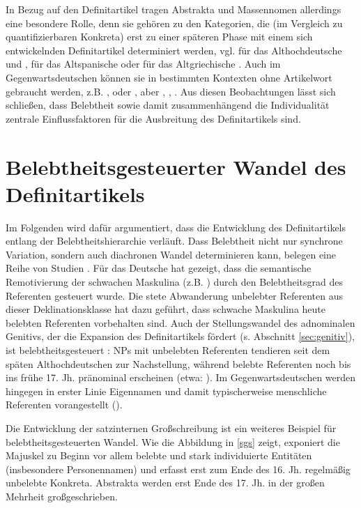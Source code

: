 In Bezug auf den Definitartikel tragen Abstrakta und Massennomen allerdings eine besondere Rolle, denn sie gehören zu den Kategorien, die (im Vergleich zu quantifizierbaren Konkreta) erst zu einer späteren Phase mit einem sich entwickelnden Definitartikel determiniert werden, vgl. für das Althochdeutsche \textcite{Oubouzar1992} und \textcite{Szczepaniak2011}, für das Altspanische \textcite{Company1991}  oder für das Altgriechische \textcite{Napoli2009}. Auch im Gegenwartsdeutschen können sie in bestimmten Kontexten ohne Artikelwort gebraucht werden, z.B. ,   oder  \parencite{DAvis2013}, aber , , . Aus diesen Beobachtungen lässt sich schließen, dass Belebtheit sowie damit zusammenhängend die Individualität zentrale Einflussfaktoren für die Ausbreitung des Definitartikels sind. 

\section{Belebtheitsgesteuerter Wandel des Definitartikels}\label{sec:belebtwandel}

Im Folgenden wird dafür argumentiert, dass die Entwicklung des Definitartikels entlang der Belebtheitshierarchie verläuft. Dass Belebtheit nicht nur synchrone Variation, sondern auch diachronen Wandel determinieren kann, belegen eine Reihe von Studien \parencite[vgl. die Übersicht in][]{Enger2011}. Für das Deutsche hat \textcite{Kopcke1995, Kopcke2000a,Kopcke2000,Kopcke2005} gezeigt, dass die semantische Remotivierung der schwachen Maskulina (z.B. )  durch den  Belebtheitsgrad des Referenten gesteuert wurde. Die stete Abwanderung unbelebter Referenten aus dieser Deklinationsklasse hat dazu geführt, dass schwache Maskulina heute belebten Referenten vorbehalten sind. 
Auch der Stellungswandel des adnominalen Genitivs, der die Expansion des Definitartikels fördert (s. Abschnitt \ref{sec:genitiv}), ist belebtheitsgesteuert \parencite[215--223]{Demske2001}: NPs mit unbelebten Referenten tendieren seit dem späten Althochdeutschen zur Nachstellung, während belebte Referenten noch bis ins frühe 17. Jh. pränominal erscheinen (etwa: ). Im Gegenwartsdeutschen werden hingegen in erster Linie Eigennamen und damit typischerweise menschliche Referenten vorangestellt  ().   

Die Entwicklung der satzinternen Großschreibung \parencite{Bergmann1998a,Bergmann1998,Bergmann1999,Szczepaniak2011,Szczepaniak2016} ist ein weiteres Beispiel für belebtheitsgesteuerten Wandel. Wie die Abbildung in \ref{sgs} zeigt, exponiert die Majuskel zu Beginn vor allem belebte und stark individuierte Entitäten (insbesondere Personennamen) und erfasst erst zum Ende des 16. Jh. regelmäßig unbelebte Konkreta. Abstrakta werden erst Ende des 17. Jh. in der großen Mehrheit großgeschrieben.   

